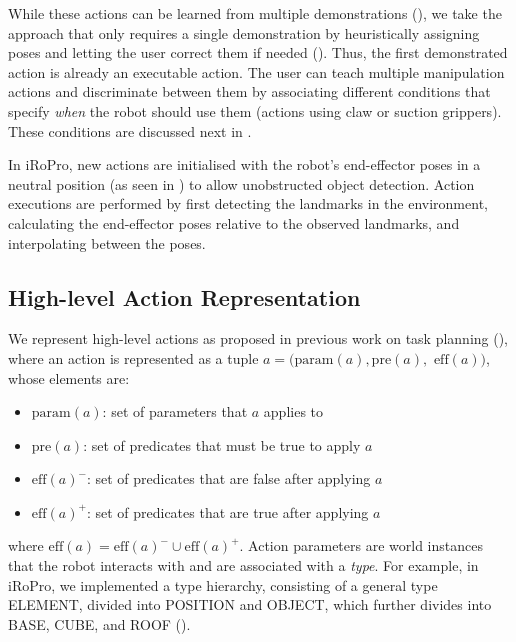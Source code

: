 While these actions can be learned from multiple demonstrations (\cite{niekum2012learning}), we take the approach that only requires a single demonstration by heuristically assigning poses and letting the user correct them if needed (\cite{alexandrova2014robot}).
Thus, the first demonstrated action is already an executable action.
The user can teach multiple manipulation actions and discriminate between them by associating different conditions that specify \textit{when} the robot should use them (\eg actions using claw or suction grippers).
These conditions are discussed next in .

In iRoPro, new actions are initialised with the robot's end-effector poses in a neutral position (as seen in ) to allow unobstructed object detection.
Action executions are performed by first detecting the landmarks in the environment, calculating the end-effector poses relative to the observed landmarks, and interpolating between the poses.



\subsection{High-level Action Representation}
\label{sec:highlevel}
We represent high-level actions as proposed in previous work on task planning (\cite{ghallab2004automated}), where an action is represented as a tuple $a = (\text{param}(a), \text{pre}(a),$ $\text{eff}(a))$, whose elements are:
\begin{itemize}
\item $\text{param}(a)$: set of parameters that $a$ applies to
\item $\text{pre}(a)$: set of predicates that must be true to apply $a$
\item $\text{eff}(a)^{-}$: set of predicates that are false after applying $a$
\item $\text{eff}(a)^{+}$: set of predicates that are true after applying $a$
\end{itemize}
where $\text{eff}(a) = \text{eff}(a)^{-} \cup \text{eff}(a)^{+}$. 
Action parameters are world instances that the robot interacts with and are associated with a \textit{type}.
For example, in iRoPro, we implemented a type hierarchy, consisting of a general type ELEMENT, divided into POSITION and OBJECT, which further divides into BASE, CUBE, and ROOF ().

